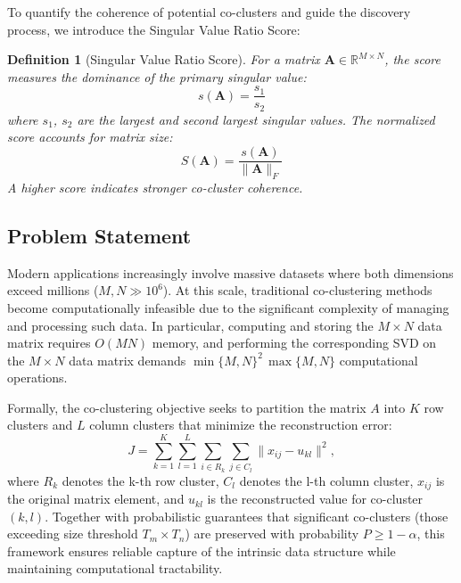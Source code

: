 \documentclass[journal]{IEEEtran}
\newtheorem{definition}{Definition}
\begin{document}
To quantify the coherence of potential co-clusters and guide the discovery process, we introduce the Singular Value Ratio Score:

\begin{definition}[Singular Value Ratio Score]
    For a matrix $\mathbf{A} \in \mathbb{R}^{M \times N}$, the score measures the dominance of the primary singular value:
    \begin{equation}
        s(\mathbf{A}) = \frac{s_1}{s_2}
    \end{equation}
    where $s_1$, $s_2$ are the largest and second largest singular values. The normalized score accounts for matrix size:
    \begin{equation}
        S(\mathbf{A}) = \frac{s(\mathbf{A})}{\|\mathbf{A}\|_F}
    \end{equation}
    A higher score indicates stronger co-cluster coherence.
\end{definition}

\subsection{Problem Statement}
\label{subsec:problem-statement}
Modern applications increasingly involve massive datasets where both dimensions exceed millions ($M, N \gg 10^6$). At this scale, traditional co-clustering methods become computationally infeasible due to the significant complexity of managing and processing such data. {\color{blue}In particular, computing and storing the $M \times N$ data matrix requires $O(MN)$ memory, and performing the corresponding SVD on the $M \times N$ data matrix demands $\min\{M,N\}^2\,\max\{M,N\}$ computational operations.}

    {\color{blue}Formally, the co-clustering objective seeks to partition the matrix $A$ into $K$ row clusters and $L$ column clusters that minimize the reconstruction error:
        \begin{equation}\label{eq:co-clustering-objective}
            J = \sum_{k=1}^{K} \sum_{l=1}^{L} \sum_{i \in R_k} \sum_{j \in C_l} \| x_{ij} - u_{kl} \|^2,
        \end{equation}
        where $R_k$ denotes the k-th row cluster, $C_l$ denotes the l-th column cluster, $x_{ij}$ is the original matrix element, and $u_{kl}$ is the reconstructed value for co-cluster $(k,l)$.}
Together with probabilistic guarantees that significant co-clusters (those exceeding size threshold $T_m \times T_n$) are preserved with probability $P \geq 1 - \alpha$, this framework ensures reliable capture of the intrinsic data structure while maintaining computational tractability.
\end{document}
